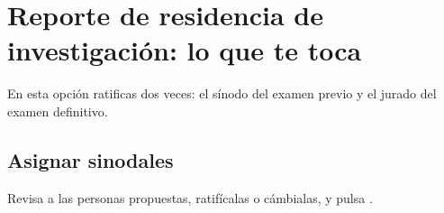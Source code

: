\section{Reporte de residencia de investigación: lo que te toca}
En esta opción ratificas dos veces: el sínodo del examen previo y el jurado del examen definitivo.
\subsection{Asignar sinodales}
Revisa a las personas propuestas, ratifícalas o cámbialas, y pulsa .
